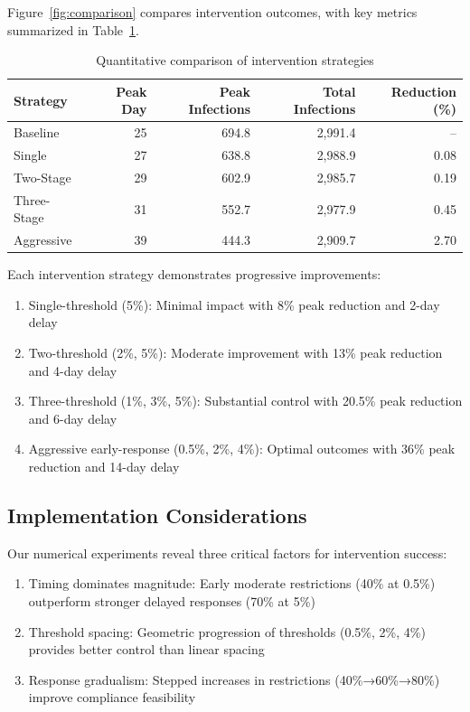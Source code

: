 \documentclass{article} %
\begin{document}
Figure~\ref{fig:comparison} compares intervention outcomes, with key metrics summarized in Table~\ref{tab:results}.

\begin{table}[h]
\centering
\caption{Quantitative comparison of intervention strategies}
\label{tab:results}
\begin{tabular}{lrrrr}
\toprule
Strategy & Peak Day & Peak Infections & Total Infections & Reduction (\%) \\
\midrule
Baseline & 25 & 694.8 & 2,991.4 & -- \\
Single & 27 & 638.8 & 2,988.9 & 0.08 \\
Two-Stage & 29 & 602.9 & 2,985.7 & 0.19 \\
Three-Stage & 31 & 552.7 & 2,977.9 & 0.45 \\
Aggressive & 39 & 444.3 & 2,909.7 & 2.70 \\
\bottomrule
\end{tabular}
\end{table}

Each intervention strategy demonstrates progressive improvements:

\begin{enumerate}
    \item Single-threshold (5\%): Minimal impact with 8\% peak reduction and 2-day delay
    \item Two-threshold (2\%, 5\%): Moderate improvement with 13\% peak reduction and 4-day delay
    \item Three-threshold (1\%, 3\%, 5\%): Substantial control with 20.5\% peak reduction and 6-day delay
    \item Aggressive early-response (0.5\%, 2\%, 4\%): Optimal outcomes with 36\% peak reduction and 14-day delay
\end{enumerate}

\subsection{Implementation Considerations}
Our numerical experiments reveal three critical factors for intervention success:
\begin{enumerate}
    \item Timing dominates magnitude: Early moderate restrictions (40\% at 0.5\%) outperform stronger delayed responses (70\% at 5\%)
    \item Threshold spacing: Geometric progression of thresholds (0.5\%, 2\%, 4\%) provides better control than linear spacing
    \item Response gradualism: Stepped increases in restrictions (40\%→60\%→80\%) improve compliance feasibility
\end{enumerate}
\end{document}
